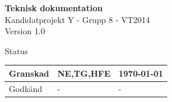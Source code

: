 \documentclass[a4paper,12pt,fleqn]{article}
\begin{document}
	\pagestyle{fancy}
	\vspace*{\fill}
		\begingroup
			\begin{center}
				\huge{\textbf{Teknisk dokumentation}}
				\\
				\vspace{5pt}
				\normalsize
				Kandidatprojekt Y - Grupp 8 - VT2014
				\\
				Version 1.0
				\end{center}
		\endgroup
	\vspace*{\fill}
	
	\begin{center} %
		Status
		\\
		\vspace{3pt} %
	    \begin{tabular}{| p{3cm} | p{3cm} | p{3cm} |} %
	    \hline %
	    Granskad & NE,TG,HFE & \today \\ \hline %
		Godkänd & - & - \\ \hline %

	    \end{tabular}
	\end{center}
	\vspace{2cm}
	\newpage
	
\end{document}
